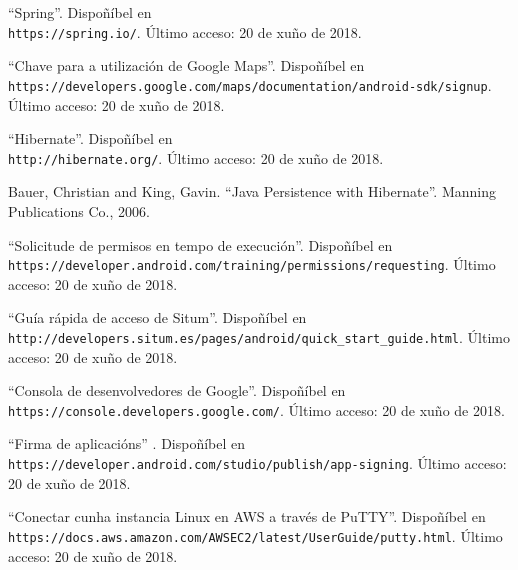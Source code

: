 \documentclass[11pt, a4paper, twoside, titlepage]{book}
\begin{document}
\begin{thebibliography}{9}
	``Spring''. Dispoñíbel en \\\texttt{https://spring.io/}. Último acceso: 20 de xuño de 2018.
	
	``Chave para a utilización de Google Maps''. Dispoñíbel en \\\texttt{https://developers.google.com/maps/documentation/android-sdk/signup}. Último acceso: 20 de xuño de 2018.
	
	``Hibernate''. Dispoñíbel en \\\texttt{http://hibernate.org/}. Último acceso: 20 de xuño de 2018.

	Bauer, Christian and King, Gavin.
	``Java Persistence with Hibernate''.
	Manning Publications Co., 2006.
	
	``Solicitude de permisos en tempo de execución''. Dispoñíbel en \\\texttt{https://developer.android.com/training/permissions/requesting}. Último acceso: 20 de xuño de 2018.
	
	``Guía rápida de acceso de Situm''. Dispoñíbel en \\\texttt{http://developers.situm.es/pages/android/quick\_start\_guide.html}. Último acceso: 20 de xuño de 2018.
	
	``Consola de desenvolvedores de Google''. Dispoñíbel en \\\texttt{https://console.developers.google.com/}. Último acceso: 20 de xuño de 2018.
	
	``Firma de aplicacións'' . Dispoñíbel en \\\texttt{https://developer.android.com/studio/publish/app-signing}. Último acceso: 20 de xuño de 2018.
	
	``Conectar cunha instancia Linux en AWS a través de PuTTY''. Dispoñíbel en \\\texttt{https://docs.aws.amazon.com/AWSEC2/latest/UserGuide/putty.html}. Último acceso: 20 de xuño de 2018.
	
\end{thebibliography}
\end{document}

